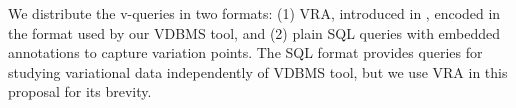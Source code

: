 We distribute the v-queries in two formats: (1) VRA, introduced in , 
encoded in the format used by
our VDBMS tool, and (2) plain SQL queries with embedded 
annotations to capture variation points.
%
The SQL format provides queries for studying variational data 
independently of VDBMS tool,
but we use VRA in
this proposal for its brevity.



%
